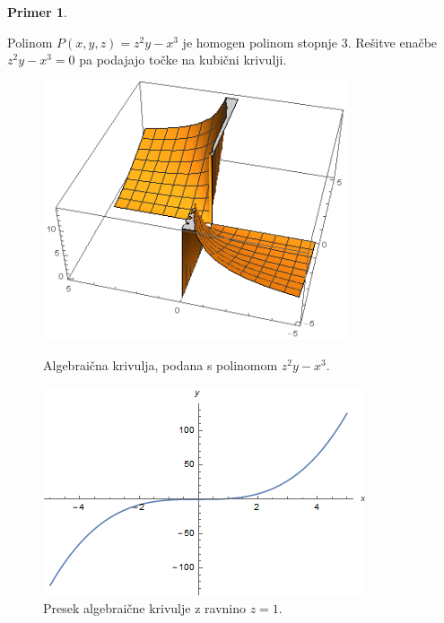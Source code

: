 \documentclass[12pt,a4paper,twoside]{article}
\theoremstyle{definition} %
\newtheorem{primer}[definicija]{Primer}
\theoremstyle{plain} %
\numberwithin{equation}{section}  %
\begin{document}
\begin{primer}~

Polinom $P(x,y,z) = z^2y-x^3$ je homogen polinom stopnje $3$. Rešitve enačbe $z^2y-x^3 = 0$ pa podajajo točke na kubični krivulji.
\\


\begin{figure}[t]
  \centering
\begin{minipage}{.45\textwidth}
\centering
  \includegraphics[width=0.8\textwidth]{images/krivulja.png}
  \caption[Primer algebraične krivulje.]{Algebraična krivulja, podana s polinomom $z^2y-x^3$.}
  \label{fig:krivulja}
\end{minipage}%
\hfill
\begin{minipage}{.45\textwidth}
\centering
\includegraphics[scale=0.5]{images/projektivnaz.png}
\caption[Presek algebraične krivulje z ravnino $z=1$.]{Presek algebraične krivulje z ravnino $z=1$.}
\label{fig:projektivnaz}
\end{minipage}
\end{figure}



\end{primer}
\end{document}
